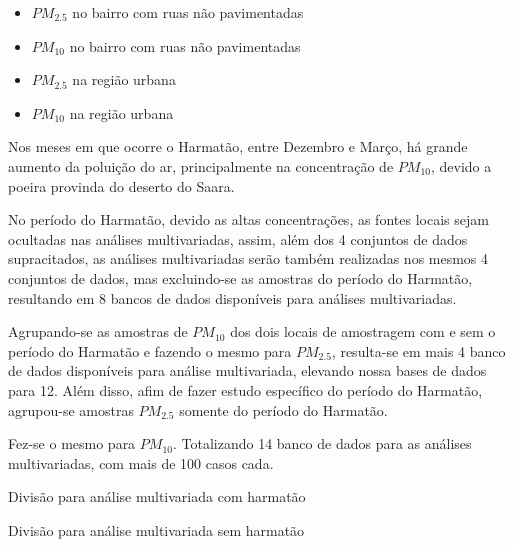 \begin{itemize}
  \item $PM_{2.5}$ no bairro com ruas não pavimentadas
  \item $PM_{10}$ no bairro com ruas não pavimentadas
  \item $PM_{2.5}$ na região urbana
  \item $PM_{10}$ na região urbana
\end{itemize}

Nos meses em que ocorre o Harmatão, entre Dezembro e Março, há grande aumento da
poluição do ar, principalmente na concentração de $PM_{10}$, devido a poeira 
provinda do deserto do Saara. 

No período do Harmatão, devido as altas concentrações, as fontes locais sejam 
ocultadas nas análises multivariadas, assim, além dos 4 conjuntos de dados 
supracitados, as análises multivariadas serão também realizadas nos mesmos 4 
conjuntos de dados, mas excluindo-se as amostras do período do Harmatão, 
resultando em 8 bancos de dados disponíveis para análises multivariadas. 

Agrupando-se as amostras de $PM_{10}$ dos dois locais de amostragem com e sem 
o período do Harmatão e fazendo o mesmo para $PM_{2.5}$, resulta-se em mais 4 
banco de dados disponíveis para análise multivariada, elevando nossa bases de
dados para 12. Além disso, afim de fazer estudo específico do período do 
Harmatão, agrupou-se amostras $PM_{2.5}$ somente do período do Harmatão. 

Fez-se o mesmo para $PM_{10}$. Totalizando 14 banco de dados para as análises 
multivariadas, com mais de 100 casos cada.  

\begin{table}[H]
  \centering
  
  \caption{Divisão para análise multivariada com harmatão}
\end{table}

\begin{table}[H]
  \centering
  
  \caption{Divisão para análise multivariada sem harmatão}
\end{table}

